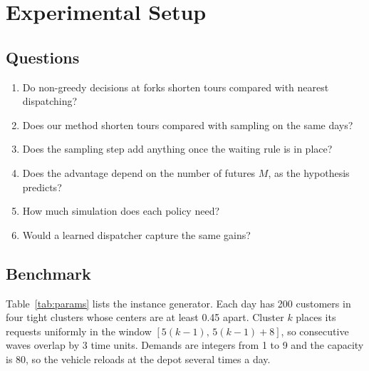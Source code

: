 \documentclass[5p,times,authoryear]{elsarticle}
\begin{document}
\section{Experimental Setup}
\label{sec:setup}

\subsection{Questions}

\begin{enumerate}[label=(Q\arabic*),leftmargin=*,nosep,topsep=2pt]
\item Do non-greedy decisions at forks shorten tours compared with nearest dispatching?
\item Does our method shorten tours compared with sampling on the same days?
\item Does the sampling step add anything once the waiting rule is in place?
\item Does the advantage depend on the number of futures $M$, as the hypothesis predicts?
\item How much simulation does each policy need?
\item Would a learned dispatcher capture the same gains?
\end{enumerate}

\subsection{Benchmark}
\label{sec:benchmark}

Table~\ref{tab:params} lists the instance generator. Each day has 200 customers in four tight clusters whose centers are at least 0.45 apart. Cluster $k$ places its requests uniformly in the window $[5(k-1),\,5(k-1)+8]$, so consecutive waves overlap by 3 time units. Demands are integers from 1 to 9 and the capacity is 80, so the vehicle reloads at the depot several times a day.
\end{document}
